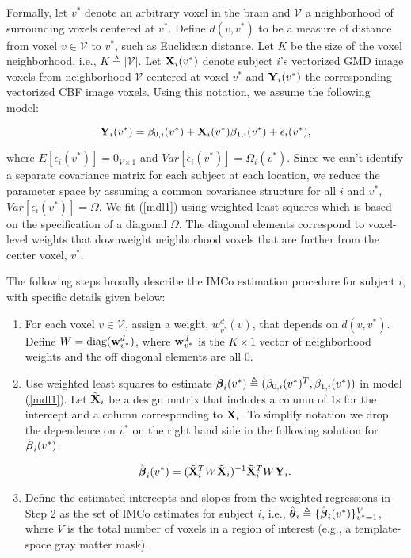 \documentclass[review]{elsarticle}
\newcommand{\bma}[1]{\mbox{\boldmath $#1$}}
\begin{document}
Formally, let $v^{*}$ denote an arbitrary voxel in the brain and $\mathcal{V}$ a neighborhood of surrounding voxels centered at $v^{*}$. Define $d(v, v^{*})$ to be a measure of distance from voxel $v \in \mathcal{V}$ to $v^{*}$, such as Euclidean distance. Let $K$ be the size of the voxel neighborhood, i.e., $K \triangleq |\mathcal{V}|$. Let ${\bf X}_{i}(v^{*})$ denote subject $i$'s vectorized GMD image voxels from neighborhood $\mathcal{V}$ centered at voxel $v^{*}$ and ${\bf Y}_{i}(v^{*})$ the corresponding vectorized CBF image voxels. Using this notation, we assume the following model:

\begin{equation}
\label{mdl1}
{\bf Y}_{i}(v^{*}) = \beta_{0, i}(v^{*}) + {\bf X}_{i}(v^{*})\beta_{1, i}(v^{*}) + \epsilon_{i}(v^{*}),
\end{equation} 

where $E[\epsilon_{i}(v^{*})] = 0_{V \times 1}$ and $Var[\epsilon_{i}(v^{*})] = \Omega_{i}(v^{*})$. Since we can't identify a separate covariance matrix for each subject at each location, we reduce the parameter space by assuming a common covariance structure for all $i$ and $v^{*}$, $Var[\epsilon_{i}(v^{*})] = \Omega$. We fit (\ref{mdl1}) using weighted least squares which is based on the specification of a diagonal $\Omega$. The diagonal elements correspond to voxel-level weights that downweight neighborhood voxels that are further from the center voxel, $v^{*}$.


The following steps broadly describe the IMCo estimation procedure for subject $i$, with specific details given below: 

\begin{enumerate}
\item For each voxel $v \in \mathcal{V}$, assign a weight, $w_{v^{*}}^{d}(v)$, that depends on $d(v, v^{*})$. Define $W = \text{diag}({\bf w}_{v^{*}}^{d})$, where ${\bf w}_{v^{*}}^{d}$ is the $K \times 1$ vector of neighborhood weights and the off diagonal elements are all 0.

\item Use weighted least squares to estimate $\bma{\beta}_{i}(v^{*}) \triangleq (\beta_{0, i}(v^{*})^{T}, \beta_{1, i}(v^{*}))$ in model (\ref{mdl1}). Let $\tilde{\bf X}_{i}$ be a design matrix that includes a column of 1s for the intercept and a column corresponding to ${\bf X}_{i}$. To simplify notation we drop the dependence on $v^{*}$ on the right hand side in the following solution for $\bma{\beta}_{i}(v^{*})$: 

\begin{equation*}
\hat{\bma{\beta}}_{i}(v^{*}) = (\tilde{\bf X}_{i}^{T}W\tilde{\bf X}_{i})^{-1}\tilde{\bf X}_{i}^{T}W{\bf Y}_{i}.
\end{equation*} 

\item Define the estimated intercepts and slopes from the weighted regressions in Step 2 as the set of IMCo estimates for subject $i$, i.e., $\hat{\bma{\theta}}_{i} \triangleq \{ \hat{\bma{\beta}}_{i}(v^{*}) \}_{v^{*} = 1}^{V}$, where $V$ is the total number of voxels in a region of interest (e.g., a template-space gray matter mask).
\end{enumerate}
\end{document}

